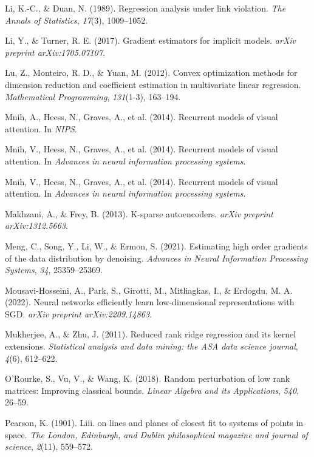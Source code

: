 \documentclass{article}
\begin{document}
\begin{thebibliography}{99}
 Li, K.-C., \& Duan, N. (1989). Regression analysis under link violation. \textit{The Annals of Statistics}, \textit{17}(3), 1009–1052.

 Li, Y., \& Turner, R. E. (2017). Gradient estimators for implicit models. \textit{arXiv preprint arXiv:1705.07107}.

 Lu, Z., Monteiro, R. D., \& Yuan, M. (2012). Convex optimization methods for dimension reduction and coefficient estimation in multivariate linear regression. \textit{Mathematical Programming}, \textit{131}(1-3), 163–194.

 Mnih, A., Heess, N., Graves, A., et al. (2014). Recurrent models of visual attention. In \textit{NIPS}.

 Mnih, V., Heess, N., Graves, A., et al. (2014). Recurrent models of visual attention. In \textit{Advances in neural information processing systems}.

 Mnih, V., Heess, N., Graves, A., et al. (2014). Recurrent models of visual attention. In \textit{Advances in neural information processing systems}.

 Makhzani, A., \& Frey, B. (2013). K-sparse autoencoders. \textit{arXiv preprint arXiv:1312.5663}.

 Meng, C., Song, Y., Li, W., \& Ermon, S. (2021). Estimating high order gradients of the data distribution by denoising. \textit{Advances in Neural Information Processing Systems}, \textit{34}, 25359–25369.

 Mousavi-Hosseini, A., Park, S., Girotti, M., Mitliagkas, I., \& Erdogdu, M. A. (2022). Neural networks efficiently learn low-dimensional representations with SGD. \textit{arXiv preprint arXiv:2209.14863}.

 Mukherjee, A., \& Zhu, J. (2011). Reduced rank ridge regression and its kernel extensions. \textit{Statistical analysis and data mining: the ASA data science journal}, \textit{4}(6), 612–622.

 O'Rourke, S., Vu, V., \& Wang, K. (2018). Random perturbation of low rank matrices: Improving classical bounds. \textit{Linear Algebra and its Applications}, \textit{540}, 26–59.

 Pearson, K. (1901). Liii. on lines and planes of closest fit to systems of points in space. \textit{The London, Edinburgh, and Dublin philosophical magazine and journal of science}, \textit{2}(11), 559–572.


\end{thebibliography}
\end{document}
